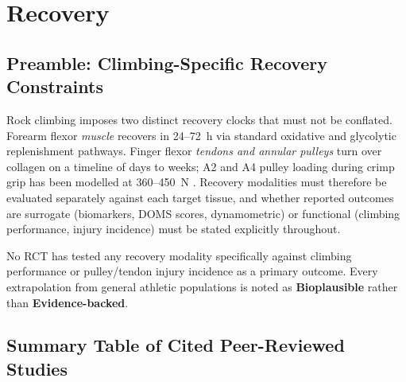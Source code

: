 \section{Recovery}
\label{sec:recovery}

\subsection*{Preamble: Climbing-Specific Recovery Constraints}

Rock climbing imposes two distinct recovery clocks that must not be conflated. Forearm flexor \emph{muscle} recovers in 24--72~h via standard oxidative and glycolytic replenishment pathways. Finger flexor \emph{tendons and annular pulleys} turn over collagen on a timeline of days to weeks; A2 and A4 pulley loading during crimp grip has been modelled at 360--450~N \cite{VQLVM06}. Recovery modalities must therefore be evaluated separately against each target tissue, and whether reported outcomes are surrogate (biomarkers, DOMS scores, dynamometric) or functional (climbing performance, injury incidence) must be stated explicitly throughout.

No RCT has tested any recovery modality specifically against climbing performance or pulley/tendon injury incidence as a primary outcome. Every extrapolation from general athletic populations is noted as \textbf{Bioplausible} rather than \textbf{Evidence-backed}.

\subsection*{Summary Table of Cited Peer-Reviewed Studies}

